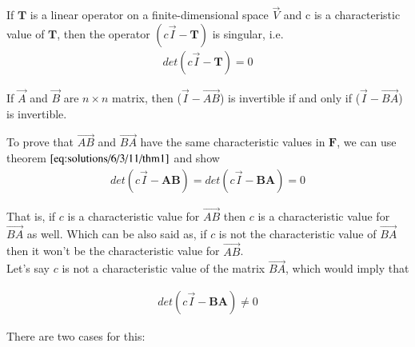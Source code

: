 	
	\begin{theorem}\label{eq:solutions/6/3/11/thm1}
		If $\mathbf{T}$ is a linear operator on a finite-dimensional space $\vec{V}$ and c is a characteristic value of $\mathbf{T}$, then the operator $(c\vec{I}-\mathbf{T})$ is singular, i.e.
		\begin{align}
			det\left(c\vec{I}-\mathbf{T}\right) = 0 \nonumber
		\end{align} 
	\end{theorem}
	\begin{theorem}\label{eq:solutions/6/3/11/thm2}
		If $\vec{A}$ and $\vec{B}$ are $n\times n$ matrix, then ($\vec{I}-\vec{AB}$) is invertible if and only if ($\vec{I}-\vec{BA}$) is invertible. 
	\end{theorem}
	
	
	To prove that $\vec{AB}$ and $\vec{BA}$ have the same characteristic values in $\mathbf{F}$, we can use theorem $\ref{eq:solutions/6/3/11/thm1}$ and show
	\begin{align}
		det\left(c\vec{I}-\mathbf{AB}\right) = det\left(c\vec{I}-\mathbf{BA}\right) = 0
	\end{align}
	
	That is, if $c$ is a characteristic value for $\vec{AB}$ then $c$ is a characteristic value for $\vec{BA}$ as well. Which can be also said as, if $c$ is not the characteristic value of $\vec{BA}$ then it won't be the characteristic value for $\vec{AB}$. \\
	
	Let's say $c$ is not a characteristic value of the matrix $\vec{BA}$, which would imply that 
	
	\begin{align}\label{eq:solutions/6/3/11/eq1}
		det(c\vec{I}-\mathbf{BA}) \neq 0
	\end{align}
	
	There are two cases for this:
	
